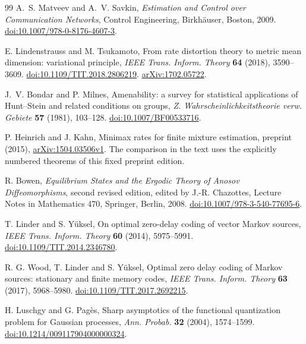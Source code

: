 \begin{thebibliography}{99}
A.~S. Matveev and A.~V. Savkin, \emph{Estimation and Control over
Communication Networks}, Control Engineering, Birkh\"auser, Boston, 2009.
\href{https://doi.org/10.1007/978-0-8176-4607-3}{doi:10.1007/978-0-8176-4607-3}.

E. Lindenstrauss and M. Tsukamoto, From rate distortion theory to
metric mean dimension: variational principle,
\emph{IEEE Trans. Inform. Theory} \textbf{64} (2018), 3590--3609.
\href{https://doi.org/10.1109/TIT.2018.2806219}{doi:10.1109/TIT.2018.2806219}.
\href{https://arxiv.org/abs/1702.05722}{arXiv:1702.05722}.

J.~V. Bondar and P. Milnes, Amenability: a survey for statistical
applications of Hunt--Stein and related conditions on groups,
\emph{Z. Wahrscheinlichkeitstheorie verw. Gebiete} \textbf{57}
(1981), 103--128.
\href{https://doi.org/10.1007/BF00533716}{doi:10.1007/BF00533716}.

P. Heinrich and J. Kahn, Minimax rates for finite mixture estimation,
preprint (2015), \href{https://arxiv.org/abs/1504.03506v1}{arXiv:1504.03506v1}.
The comparison in the text uses the explicitly numbered theorems
of this fixed preprint edition.

R. Bowen, \emph{Equilibrium States and the Ergodic Theory of Anosov
Diffeomorphisms}, second revised edition, edited by J.-R. Chazottes,
Lecture Notes in Mathematics 470, Springer, Berlin, 2008.
\href{https://doi.org/10.1007/978-3-540-77695-6}{doi:10.1007/978-3-540-77695-6}.

T. Linder and S. Y\"uksel, On optimal zero-delay coding of vector
Markov sources, \emph{IEEE Trans. Inform. Theory} \textbf{60}
(2014), 5975--5991.
\href{https://doi.org/10.1109/TIT.2014.2346780}{doi:10.1109/TIT.2014.2346780}.

R. G. Wood, T. Linder and S. Y\"uksel, Optimal zero delay coding of
Markov sources: stationary and finite memory codes,
\emph{IEEE Trans. Inform. Theory} \textbf{63} (2017), 5968--5980.
\href{https://doi.org/10.1109/TIT.2017.2692215}{doi:10.1109/TIT.2017.2692215}.

H. Luschgy and G. Pag\`es, Sharp asymptotics of the functional
quantization problem for Gaussian processes,
\emph{Ann. Probab.} \textbf{32} (2004), 1574--1599.
\href{https://doi.org/10.1214/009117904000000324}{doi:10.1214/009117904000000324}.


\end{thebibliography}
